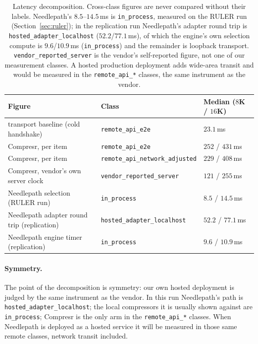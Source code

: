 \documentclass[11pt]{article}
\newcommand{\NP}{Needlepath}
\begin{document}
\begin{table}[t]
\centering
\small
\begin{tabular}{@{}lll@{}}
\toprule
Figure & Class & Median ($8$K / $16$K) \\
\midrule
transport baseline (cold handshake) & \texttt{remote\_api\_e2e} & $23.1$\,ms \\
Compresr, per item                  & \texttt{remote\_api\_e2e} & $252$ / $431$\,ms \\
Compresr, per item                  & \texttt{remote\_api\_network\_adjusted} & $229$ / $408$\,ms \\
Compresr, vendor's own server clock & \texttt{vendor\_reported\_server} & $121$ / $255$\,ms \\
\NP{} selection (RULER run)         & \texttt{in\_process} & $8.5$ / $14.5$\,ms \\
\NP{} adapter round trip (replication) & \texttt{hosted\_adapter\_localhost} & $52.2$ / $77.1$\,ms \\
\NP{} engine timer (replication)    & \texttt{in\_process} & $9.6$ / $10.9$\,ms \\
\bottomrule
\end{tabular}
\caption{Latency decomposition. Cross-class figures are never compared without their labels. \NP{}'s
$8.5$--$14.5$\,ms is \texttt{in\_process}, measured on the RULER run (Section~\ref{sec:ruler}); in
the replication run \NP{}'s adapter round trip is \texttt{hosted\_adapter\_localhost}
($52.2$/$77.1$\,ms), of which the engine's own selection compute is $9.6$/$10.9$\,ms
(\texttt{in\_process}) and the remainder is loopback transport. \texttt{vendor\_reported\_server} is
the vendor's self-reported figure, not one of our measurement classes. A hosted production
deployment adds wide-area transit and would be measured in the \texttt{remote\_api\_*} classes,
the same instrument as the vendor.}
\label{tab:latency}
\end{table}

\paragraph{Symmetry.} The point of the decomposition is symmetry: our own hosted deployment is
judged by the same instrument as the vendor. In this run \NP{}'s path is
\texttt{hosted\_adapter\_localhost}; the local compressors it is usually shown against are
\texttt{in\_process}; Compresr is the only arm in the \texttt{remote\_api\_*} classes. When \NP{}
is deployed as a hosted service it will be measured in those same remote classes, network transit
included.
\end{document}
